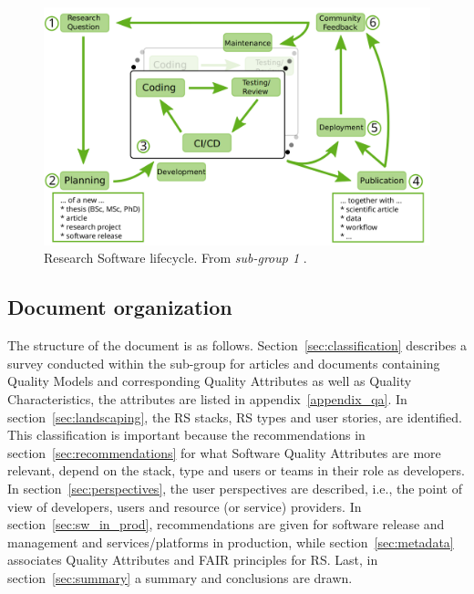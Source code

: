 \begin{figure}[h]
    \centering
    \includegraphics[width=0.90\linewidth]{imgs/rs_lifecycle.png}
    \caption{Research Software lifecycle. From \textit{sub-group 1} \cite{sg1tf2023}.}
    \label{fig:rslifecycle}
\end{figure}

\subsection{Document organization}

The structure of the document is as follows. Section~\ref{sec:classification} describes a survey conducted within the sub-group for articles and documents containing Quality Models and corresponding Quality Attributes as well as Quality Characteristics, the attributes are listed in appendix~\ref{appendix_qa}. In section~\ref{sec:landscaping}, the RS stacks, RS types and user stories, are identified. This classification is important because the recommendations in section~\ref{sec:recommendations} for what Software Quality Attributes are more relevant, depend on the stack, type and users or teams in their role as developers. In section~\ref{sec:perspectives}, the user perspectives are described, i.e., the point of view of developers, users and resource (or service) providers. In section~\ref{sec:sw_in_prod}, recommendations are given for software release and management and services/platforms in production, while section~\ref{sec:metadata} associates Quality Attributes and FAIR principles for RS. Last, in section~\ref{sec:summary} a summary and conclusions are drawn.
